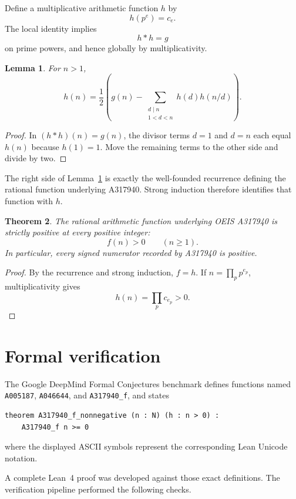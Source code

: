 \documentclass[11pt]{article}
\newtheorem{theorem}{Theorem}[section]
\newtheorem{lemma}[theorem]{Lemma}
\theoremstyle{definition}
\theoremstyle{remark}
\begin{document}
Define a multiplicative arithmetic function $h$ by
\[
  h(p^e)=c_e.
\]
The local identity implies
\[
  h*h=g
\]
on prime powers, and hence globally by multiplicativity.

\begin{lemma}\label{lem:recurrence}
For $n>1$,
\[
  h(n)=\frac12\left(
    g(n)-\sum_{\substack{d\mid n\\1<d<n}}h(d)h(n/d)
  \right).
\]
\end{lemma}

\begin{proof}
In $(h*h)(n)=g(n)$, the divisor terms $d=1$ and $d=n$ each equal $h(n)$ because $h(1)=1$.  Move the remaining terms to the other side and divide by two.
\end{proof}

The right side of Lemma~\ref{lem:recurrence} is exactly the well-founded recurrence defining the rational function underlying A317940.  Strong induction therefore identifies that function with $h$.

\begin{theorem}\label{thm:A317940}
The rational arithmetic function underlying OEIS A317940 is strictly positive at every positive integer:
\[
  f(n)>0\qquad(n\ge1).
\]
In particular, every signed numerator recorded by A317940 is positive.
\end{theorem}

\begin{proof}
By the recurrence and strong induction, $f=h$.  If
$n=\prod_p p^{e_p}$, multiplicativity gives
\[
  h(n)=\prod_p c_{e_p}>0.
\]
\end{proof}

\section{Formal verification}

The Google DeepMind Formal Conjectures benchmark defines functions named
\texttt{A005187}, \texttt{A046644}, and \texttt{A317940\_f}, and states
\begin{verbatim}
theorem A317940_f_nonnegative (n : N) (h : n > 0) :
    A317940_f n >= 0
\end{verbatim}
where the displayed ASCII symbols represent the corresponding Lean Unicode notation.

A complete Lean~4 proof was developed against those exact definitions.  The verification pipeline performed the following checks.
\end{document}
